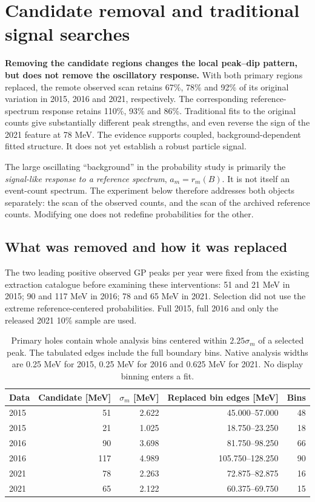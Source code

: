 \section{Candidate removal and traditional signal searches}
\label{sec:candidate-removal}
\textbf{Removing the candidate regions changes the local peak--dip pattern, but does not remove the oscillatory response.} With both primary regions replaced, the remote observed scan retains 67\%, 78\% and 92\% of its original variation in 2015, 2016 and 2021, respectively. The corresponding reference-spectrum response retains 110\%, 93\% and 86\%. Traditional fits to the original counts give substantially different peak strengths, and even reverse the sign of the 2021 feature at 78 MeV. The evidence supports coupled, background-dependent fitted structure. It does not yet establish a robust particle signal.

The large oscillating ``background'' in the probability study is primarily the \emph{signal-like response to a reference spectrum}, $a_m=r_m(B)$. It is not itself an event-count spectrum. The experiment below therefore addresses both objects separately: the scan of the observed counts, and the scan of the archived reference counts. Modifying one does not redefine probabilities for the other.

\subsection*{What was removed and how it was replaced}
The two leading positive observed GP peaks per year were fixed from the existing extraction catalogue before examining these interventions: 51 and 21 MeV in 2015; 90 and 117 MeV in 2016; 78 and 65 MeV in 2021. Selection did not use the extreme reference-centered probabilities. Full 2015, full 2016 and only the released 2021 10\% sample are used.
\begin{table}[H]
\centering\small
\begin{tabular}{lrrrr}
\toprule
Data & Candidate [MeV] & $\sigma_m$ [MeV] & Replaced bin edges [MeV] & Bins \\
\midrule
2015 & 51 & 2.622 & 45.000--57.000 & 48 \\
2015 & 21 & 1.025 & 18.750--23.250 & 18 \\
2016 & 90 & 3.698 & 81.750--98.250 & 66 \\
2016 & 117 & 4.989 & 105.750--128.250 & 90 \\
2021 & 78 & 2.263 & 72.875--82.875 & 16 \\
2021 & 65 & 2.122 & 60.375--69.750 & 15 \\
\bottomrule
\end{tabular}
\caption{Primary holes contain whole analysis bins centered within $2.25\sigma_m$ of a selected peak. The tabulated edges include the full boundary bins. Native analysis widths are 0.25 MeV for 2015, 0.25 MeV for 2016 and 0.625 MeV for 2021. No display binning enters a fit.}\label{tab:removal-holes}
\end{table}

